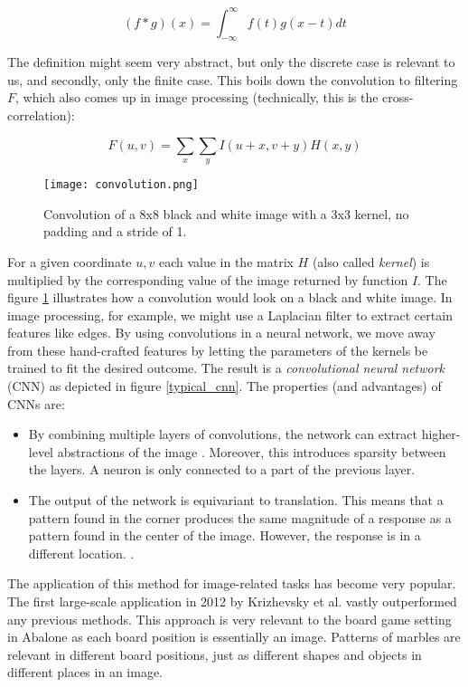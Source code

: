$$
    (f * g)(x) = \int_{-\infty}^{\infty} f(t)g(x - t) dt
$$

The definition might seem very abstract, but only the discrete case is relevant to us, and secondly, only the finite case. This boils down the convolution to filtering $F$, which also comes up in image processing (technically, this is the cross-correlation):

$$
    F(u, v) = \sum_{x} \sum_{y} I(u+x, v+y)H(x, y)
$$

\begin{figure}
    \centering
    \texttt{[image: convolution.png]}
    \caption{Convolution of a 8x8 black and white image with a 3x3 kernel, no padding and a stride of 1. \cite[cf. p. 13]{bruasdal_deep_2020}}
    \label{convolution}
\end{figure}

For a given coordinate $u,v$ each value in the matrix $H$ (also called \textit{kernel}) is multiplied by the  corresponding value of the image returned by function $I$. The figure \ref{convolution} illustrates how a convolution would look on a black and white image. In image processing, for example, we might use a Laplacian filter to extract certain features like edges. By using convolutions in a neural network, we move away from these hand-crafted features by letting the parameters of the kernels be trained to fit the desired outcome. The result is a \textit{convolutional neural network} (CNN) as depicted in figure \ref{typical_cnn}. The properties (and advantages) of CNNs are:

\begin{itemize}
    \item By combining multiple layers of convolutions, the network can extract higher-level abstractions of the image \cite{ilin_abstraction_2017}. Moreover, this introduces sparsity between the layers. A neuron is only connected to a part of the previous layer.
    \item The output of the network is equivariant to translation. This means that a pattern found in the corner produces the same magnitude of a response as a pattern found in the center of the image. However, the response is in a different location. \cite{208949}.
\end{itemize}

The application of this method for image-related tasks has become very popular. The first large-scale application in 2012 by Krizhevsky et al. \cite{krizhevsky_imagenet_2017} vastly outperformed any previous methods. This approach is very relevant to the board game setting in Abalone as each board position is essentially an image. Patterns of marbles are relevant in different board positions, just as different shapes and objects in different places in an image.

